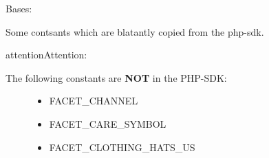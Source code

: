 \documentclass[letterpaper,10pt,english]{sphinxmanual}
\begin{document}

\begin{fulllineitems}
\label{collins:collins.Constants}
Bases: 

Some contsants which are blatantly copied from the php-sdk.

\begin{notice}{attention}{Attention:}\begin{description}
\item[{The following constants are \textbf{NOT} in the PHP-SDK:}] \leavevmode\begin{itemize}
\item {} 
FACET\_CHANNEL

\item {} 
FACET\_CARE\_SYMBOL

\item {} 
FACET\_CLOTHING\_HATS\_US

\end{itemize}

\end{description}
\end{notice}

\begin{fulllineitems}
\label{collins:collins.Constants.API_ENVIRONMENT_LIVE}
\end{fulllineitems}


\begin{fulllineitems}
\label{collins:collins.Constants.API_ENVIRONMENT_STAGE}
\end{fulllineitems}


\begin{fulllineitems}
\label{collins:collins.Constants.FACETS}
\end{fulllineitems}


\begin{fulllineitems}
\label{collins:collins.Constants.FACET_BRAND}
\end{fulllineitems}


\end{fulllineitems}
\end{document}
